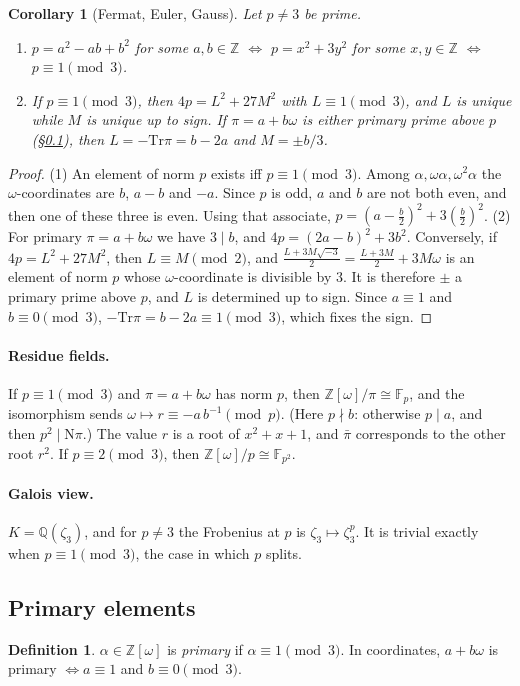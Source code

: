 \documentclass[11pt]{article}
\numberwithin{equation}{section}
\newcommand{\N}{\mathrm N}
\newcommand{\Tr}{\mathrm{Tr}}
\newcommand{\OO}{\mathbb Z[\omega]}
\newcommand{\Q}{\mathbb Q}
\newcommand{\Z}{\mathbb Z}
\newcommand{\F}{\mathbb F}
\newtheorem{corollary}[theorem]{Corollary}
\theoremstyle{definition}
\newtheorem{definition}[theorem]{Definition}
\theoremstyle{remark}
\begin{document}
\begin{corollary}[Fermat, Euler, Gauss]\label{cor:forms}
Let $p\ne3$ be prime.
\begin{enumerate}
\item $p=a^2-ab+b^2$ for some $a,b\in\Z$ $\iff$ $p=x^2+3y^2$ for some $x,y\in\Z$ $\iff$ $p\equiv1\pmod 3$.
\item If $p\equiv1\pmod3$, then $4p=L^2+27M^2$ with $L\equiv1\pmod 3$, and $L$ is
unique while $M$ is unique up to sign. If $\pi=a+b\omega$ is either primary prime above $p$
(\S\ref{sec:primary}), then $L=-\Tr\pi=b-2a$ and $M=\pm b/3$.
\end{enumerate}
\end{corollary}
\begin{proof}
(1) An element of norm $p$ exists iff $p\equiv1\pmod 3$. Among $\alpha,\omega\alpha,\omega^2\alpha$
the $\omega$-coordinates are $b$, $a-b$ and $-a$. Since $p$ is odd, $a$ and $b$ are not both
even, and then one of these three is even. Using that associate,
$p=(a-\frac b2)^2+3(\frac b2)^2$. (2) For primary $\pi=a+b\omega$ we have $3\mid b$, and
$4p=(2a-b)^2+3b^2$. Conversely, if $4p=L^2+27M^2$, then $L\equiv M\pmod2$, and
$\frac{L+3M\sqrt{-3}}2=\frac{L+3M}2+3M\omega$ is an element of norm $p$ whose
$\omega$-coordinate is divisible by $3$. It is therefore $\pm$ a primary prime above $p$, and
$L$ is determined up to sign. Since $a\equiv1$ and $b\equiv0\pmod 3$, $-\Tr\pi=b-2a\equiv1\pmod 3$,
which fixes the sign.
\end{proof}

\paragraph{Residue fields.} If $p\equiv1\pmod3$ and $\pi=a+b\omega$ has norm $p$, then
$\OO/\pi\cong\F_p$, and the isomorphism sends $\omega\mapsto r\equiv-a\,b^{-1}\pmod p$. (Here $p\nmid b$:
otherwise $p\mid a$, and then $p^2\mid\N\pi$.) The value $r$ is a root of $x^2+x+1$, and $\bar\pi$
corresponds to the other root $r^2$. If $p\equiv2\pmod3$, then $\OO/p\cong\F_{p^2}$.

\paragraph{Galois view.} $K=\Q(\zeta_3)$, and for $p\ne3$ the Frobenius at $p$ is
$\zeta_3\mapsto\zeta_3^p$. It is trivial exactly when $p\equiv1\pmod3$, the case in which $p$ splits.

\subsection{Primary elements}\label{sec:primary}
\begin{definition}
$\alpha\in\OO$ is \emph{primary} if $\alpha\equiv1\pmod 3$. In coordinates,
$a+b\omega$ is primary $\iff a\equiv1$ and $b\equiv0\pmod 3$.
\end{definition}
\end{document}
